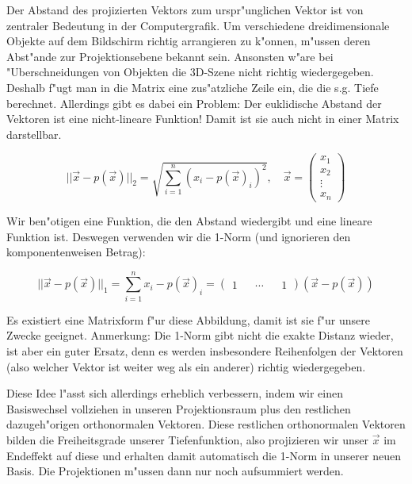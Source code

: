 \documentclass{article}
\begin{document}
Der Abstand des projizierten Vektors zum urspr"unglichen Vektor ist von zentraler Bedeutung in der
Computergrafik. Um verschiedene dreidimensionale Objekte auf dem Bildschirm richtig arrangieren zu
k"onnen, m"ussen deren Abst"ande zur Projektionsebene bekannt sein. Ansonsten w"are bei
"Uberschneidungen von Objekten die 3D-Szene nicht richtig wiedergegeben.
Deshalb f"ugt man in die Matrix eine zus"atzliche Zeile ein, die die s.g. Tiefe berechnet.
Allerdings gibt es dabei ein Problem: Der euklidische Abstand der Vektoren ist eine nicht-lineare
Funktion! Damit ist sie auch nicht in einer Matrix darstellbar.

	\begin{equation}
		||\vec{x} - p(\vec{x})||_2 = \sqrt{\sum_{i=1}^{n}{(x_i - p(\vec{x})_i)^2}}, \quad \vec{x} =
		\begin{pmatrix}
			x_1 \\
			x_2 \\
			\vdots \\
			x_n
		\end{pmatrix}
	\end{equation}

Wir ben"otigen eine Funktion, die den Abstand wiedergibt und eine lineare Funktion ist. Deswegen
verwenden wir die 1-Norm (und ignorieren den komponentenweisen Betrag):

	\begin{equation}
		||\vec{x} - p(\vec{x})||_1 = \sum_{i=1}^{n}{x_i - p(\vec{x})_i} = \begin{pmatrix} 1 && \cdots && 1 \end{pmatrix} (\vec{x} - p(\vec{x}))
	\end{equation}

Es existiert eine Matrixform f"ur diese Abbildung, damit ist sie f"ur unsere Zwecke geeignet.
Anmerkung: Die 1-Norm gibt nicht die exakte Distanz wieder, ist aber ein guter Ersatz, denn es
werden insbesondere Reihenfolgen der Vektoren (also welcher Vektor ist weiter weg als ein anderer)
richtig wiedergegeben.

Diese Idee l"asst sich allerdings erheblich verbessern, indem wir einen Basiswechsel vollziehen in
unseren Projektionsraum plus den restlichen dazugeh"origen orthonormalen Vektoren. Diese restlichen
orthonormalen Vektoren bilden die Freiheitsgrade unserer Tiefenfunktion, also projizieren wir unser
\(\vec{x}\) im Endeffekt auf diese und erhalten damit automatisch die 1-Norm in unserer neuen
Basis. Die Projektionen m"ussen dann nur noch aufsummiert werden.
\end{document}

